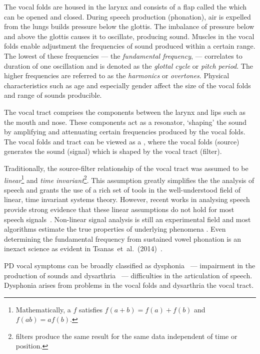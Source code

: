 \documentclass[12pt, twoside]{book}
\renewcommand\emph[1]{\textit{\color{USred}{#1}}}
\begin{document}
The vocal folds are housed in the larynx and consists of a flap called the \emph{glottis} which can be opened and closed. During speech production (phonation), air is expelled from the lungs builds pressure below the glottis. The imbalance of pressure below and above the glottis causes it to oscillate, producing sound. Muscles in the vocal folds enable adjustment the frequencies of sound produced within a certain range. The lowest of these frequencies --- the \textit{fundamental frequency}, \emph{$f_0$} --- correlates to duration of one oscillation and is denoted as the \textit{glottal cycle} or \textit{pitch period}. The higher frequencies are referred to as the \textit{harmonics} or \textit{overtones}. Physical characteristics such as age and especially gender affect the size of the vocal folds and range of sounds producible. 

The vocal tract comprises the components between the larynx and lips such as the mouth and nose. These components act as a resonator, `shaping' the sound by amplifying and attenuating certain frequencies produced by the vocal folds. The vocal folds and tract can be viewed as a \emph{source-filter model}, where the vocal folds (source) generates the sound (signal) which is shaped by the vocal tract (filter). 


Traditionally, the source-filter relationship of the vocal tract was assumed to be \textit{linear}\footnote{Mathematically, a \emph{linear function} $f$ satisfies $f(a+b) = f(a) + f(b)$ and $f(ab) = af(b)$.} and \textit{time invariant}\footnote{\emph{Time invariant} filters produce the same result for the same data independent of time or position.}. This assumption greatly simplifies the the analysis of speech and grants the use of a rich set of tools in the well-understood field of linear, time invariant systems theory. However, recent works in analysing speech provide strong evidence that these linear assumptions do not hold for most speech signals~\cite{nonlineardisorder, little2007biomechanically,titze2008nonlinear}. Non-linear signal analysis is still an experimental field and most algorithms estimate the true properties of underlying phenomena . Even determining the fundamental frequency from sustained vowel phonation is an inexact science as evident in Tsanas~et~al.~(2014)~\cite{f0estimation}.


PD vocal symptoms can be broadly classified as dysphonia~\cite{spworkshoptitze} --- impairment in the production of sounds and dysarthria~\cite{rosen2006parametric} --- difficulties in the articulation of speech. Dysphonia arises from problems in the vocal folds and dysarthria the vocal tract. 
\end{document}
